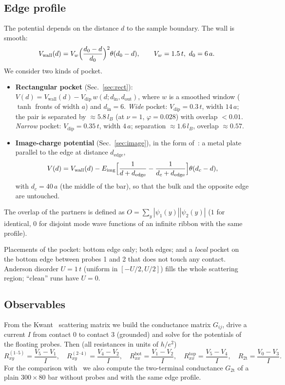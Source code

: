 \documentclass[11pt,a4paper]{article}
\newcommand{\he}{h/e^2}
\newcommand{\Rxy}{R_{xy}}
\newcommand{\Rxx}{R_{xx}}
\newcommand{\lB}{l_B}
\newcommand{\botm}{\text{bot}}
\newcommand{\topp}{\text{top}}
\begin{document}
\subsection{Edge profile}
The potential depends on the distance $d$ to the sample boundary. The wall
is smooth:
\[
V_\text{wall}(d)=V_w\Bigl(\frac{d_0-d}{d_0}\Bigr)^2\theta(d_0-d),\qquad
V_w=1.5\,t,\ d_0=6\,a .
\]
We consider two kinds of pocket.
\begin{itemize}
\item \textbf{Rectangular pocket} (Sec.~\ref{sec:rect}):
  $V(d)=V_\text{wall}(d)-V_\text{dip}\,w(d;d_\text{in},d_\text{out})$, where
  $w$ is a smoothed window ($\tanh$ fronts of width $a$) and
  $d_\text{in}=6$. \emph{Wide} pocket: $V_\text{dip}=0.3\,t$, width $14\,a$;
  the pair is separated by $\approx5.8\,\lB$ (at $\nu=1$, $\varphi=0.028$)
  with overlap $<0.01$. \emph{Narrow} pocket: $V_\text{dip}=0.35\,t$, width
  $4\,a$; separation $\approx1.6\,\lB$, overlap $\approx0.57$.
\item \textbf{Image-charge potential} (Sec.~\ref{sec:image}), in the form
  of~\cite{andolina}: a metal plate parallel to the edge at distance
  $d_\text{edge}$,
  \begin{equation}\label{eq:img}
  V(d)=V_\text{wall}(d)-E_\text{img}\Bigl[\frac1{d+d_\text{edge}}-
  \frac1{d_c+d_\text{edge}}\Bigr]\theta(d_c-d),
  \end{equation}
  with $d_c=40\,a$ (the middle of the bar), so that the bulk and the
  opposite edge are untouched.
\end{itemize}
The overlap of the partners is defined as $O=\sum_y|\psi_1(y)||\psi_2(y)|$
($1$ for identical, $0$ for disjoint mode wave functions of an infinite
ribbon with the same profile).

Placements of the pocket: bottom edge only; both edges; and a \emph{local}
pocket on the bottom edge between probes 1 and 2 that does not touch any
contact. Anderson disorder $U=1\,t$ (uniform in $[-U/2,U/2]$) fills the
whole scattering region; ``clean'' runs have $U=0$.

\subsection{Observables}
From the Kwant~\cite{kwant} scattering matrix we build the conductance
matrix $G_{ij}$, drive a current $I$ from contact 0 to contact 3 (grounded)
and solve for the potentials of the floating probes. Then (all resistances
in units of $\he$)
\[
\Rxy^{(1\text{--}5)}=\frac{V_5-V_1}{I},\quad
\Rxy^{(2\text{--}4)}=\frac{V_4-V_2}{I},\quad
\Rxx^{\botm}=\frac{V_1-V_2}{I},\quad
\Rxx^{\topp}=\frac{V_5-V_4}{I},\quad
R_\text{2t}=\frac{V_0-V_3}{I}.
\]
For the comparison with~\cite{andolina} we also compute the two-terminal
conductance $G_\text{2t}$ of a plain $300\times80$ bar without probes and
with the same edge profile.
\end{document}
